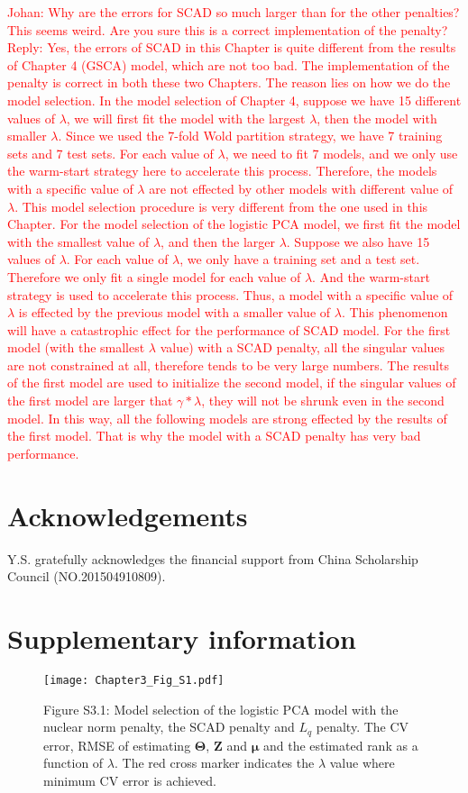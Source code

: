 \textcolor{red}{Johan: Why are the errors for SCAD so much larger than for the other penalties? This seems weird. Are you sure this is a correct implementation of the penalty? Reply: Yes, the errors of SCAD in this Chapter is quite different from the results of Chapter 4 (GSCA) model, which are not too bad. The implementation of the penalty is correct in both these two Chapters. The reason lies on how we do the model selection. In the model selection of Chapter 4, suppose we have 15 different values of $\lambda$, we will first fit the model with the largest $\lambda$, then the model with smaller $\lambda$. Since we used the 7-fold Wold partition strategy, we have 7 training sets and 7 test sets. For each value of $\lambda$, we need to fit 7 models, and we only use the warm-start strategy here to accelerate this process. Therefore, the models with a specific value of $\lambda$ are not effected by other models with different value of $\lambda$. This model selection procedure is very different from the one used in this Chapter. For the model selection of the logistic PCA model, we first fit the model with the smallest value of $\lambda$, and then the larger $\lambda$. Suppose we also have 15 values of $\lambda$. For each value of $\lambda$, we only have a training set and a test set. Therefore we only fit a single model for each value of $\lambda$. And the warm-start strategy is used to accelerate this process. Thus, a model with a specific value of $\lambda$ is effected by the previous model with a smaller value of $\lambda$. This phenomenon will have a catastrophic effect for the performance of SCAD model. For the first model (with the smallest $\lambda$ value) with a SCAD penalty, all the singular values are not constrained at all, therefore tends to be very large numbers. The results of the first model are used to initialize the second model, if the singular values of the first model are larger that $\gamma * \lambda$, they will not be shrunk even in the second model. In this way, all the following models are strong effected by the results of the first model. That is why the model with a SCAD penalty has very bad performance.}

\section*{Acknowledgements}
Y.S. gratefully acknowledges the financial support from China Scholarship Council (NO.201504910809).

\clearpage
\section{Supplementary information}
\begin{figure}[htbp]
    \centering
    \texttt{[image: Chapter3\_Fig\_S1.pdf]}
    \caption*{Figure S3.1: Model selection of the logistic PCA model with the nuclear norm penalty, the SCAD penalty and $L_{q}$ penalty. The CV error, RMSE of estimating $\mathbf{\Theta}$, $\mathbf{Z}$ and $\bm{\mu}$ and the estimated rank as a function of $\lambda$. The red cross marker indicates the $\lambda$ value where minimum CV error is achieved.}
    \label{chapter3_fig:S1}
\end{figure}

